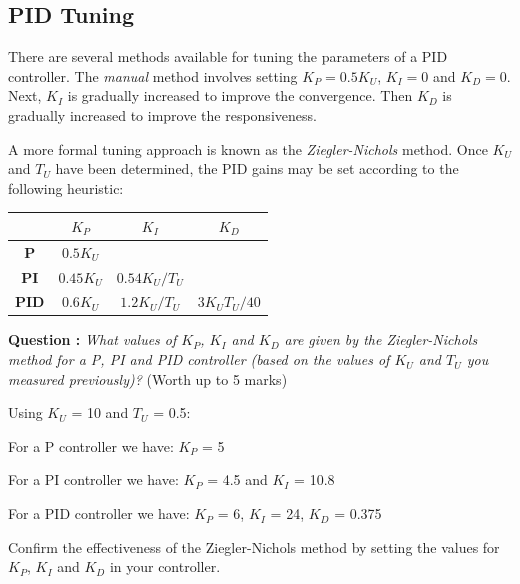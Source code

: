 \documentclass[hidelinks,a4paper,11pt]{article}
\newcounter{question}
\newcommand\myq{\refstepcounter{question}\thequestion}
\begin{document}
	
	\subsection {PID Tuning}
	
	There are several methods available for tuning the parameters of a PID controller.  The \emph{manual} method involves setting $K_P=0.5K_U$, $K_I=0$ and $K_D=0$.  Next, $K_I$ is gradually increased to improve the convergence.  Then $K_D$ is gradually increased to improve the responsiveness.
	
	A more formal tuning approach is known as the \emph{Ziegler-Nichols} method.  Once $K_U$ and $T_U$ have been determined, the PID gains may be set according to the following heuristic:
	\begin{center}
		\begin{tabular}{ | c | c | c | c | } \hline
			& \bf{$K_P$} & \bf{$K_I$} & \bf{$K_D$} \\ \hline
			\bf{P} & $0.5K_U$ &  &  \\ \hline
			\bf{PI} & $0.45K_U$ & $0.54K_U/T_U$ &  \\ \hline
			\bf{PID} & $0.6K_U$ & $1.2K_U/T_U$ & $3K_UT_U/40$ \\ \hline
		\end{tabular}
	\end{center}
	\vspace*{\baselineskip}
	
	{\bfseries Question \myq:}  \emph{What values of $K_P$, $K_I$ and $K_D$ are given by the Ziegler-Nichols method for a P, PI and PID controller (based on the values of $K_U$ and $T_U$ you measured previously)?} (Worth up to 5 marks)\\
	\begin{mdframed}
		Using $K_U$ = 10 and $T_U$ = 0.5:
		
		For a P controller we have: $K_P$ = 5
		
		For a PI controller we have: $K_P$ = 4.5 and $K_I$ = 10.8
		
		For a PID controller we have: $K_P$ = 6, $K_I$ = 24, $K_D$ = 0.375
	\end{mdframed}
	\vspace*{\baselineskip}
	
	\begin{todolist}
		\item Confirm the effectiveness of the Ziegler-Nichols method by setting the values for $K_P$, $K_I$ and $K_D$ in your controller.
	\end{todolist}
	
\end{document}
